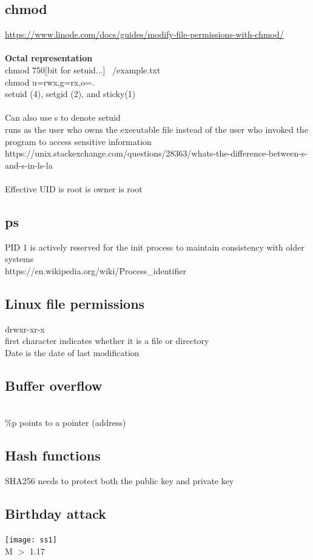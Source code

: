 \documentclass[11pt]{article}
\begin{document}
\begin{multicols*}{3}
\subsection*{chmod}
\textcolor{link}{\url{https://www.linode.com/docs/guides/modify-file-permissions-with-chmod/}}\\\\
\textbf{Octal representation}\\
chmod 750[bit for setuid...] ~/example.txt\\
chmod u=rwx,g=rx,o=.\\
setuid (4), setgid (2), and sticky(1)\\
\\
Can also use s to denote setuid\\
runs as the user who owns the executable file instead of the user who invoked the program to access sensitive information\\
\textcolor{link}{https://unix.stackexchange.com/questions/28363/whats-the-difference-between-s-and-s-in-ls-la}\\\\
Effective UID is root is owner is root
\subsection*{ps}
PID 1 is actively reserved for the init process to maintain consistency with older systems\\
\textcolor{link}{https://en.wikipedia.org/wiki/Process\_identifier}\\
\subsection*{Linux file permissions}
drwxr-xr-x\\
first character indicates whether it is a file or directory\\
Date is the date of last modification
\subsection*{Buffer overflow}\\
\%p points to a pointer (address)\\
\subsection*{Hash functions}
SHA256 needs to protect both the public key and private key
\subsection*{Birthday attack}
\texttt{[image: ss1]}
\\
M $>$ 1.17 

\end{multicols*}
\end{document}

